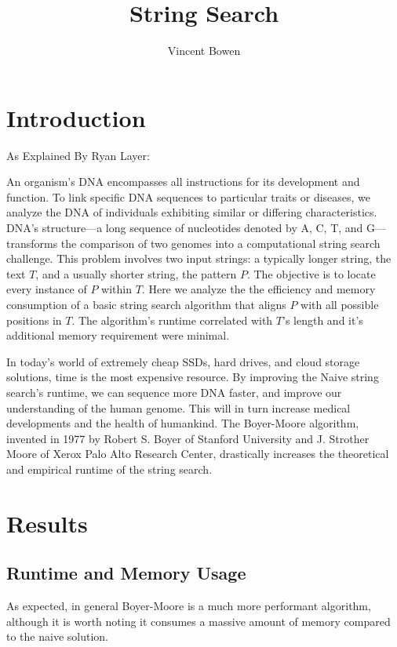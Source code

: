 \documentclass[11pt, letterpaper]{article}
\begin{document}
\title{String Search}
\author{Vincent Bowen}
\maketitle

\section{Introduction}
As Explained By Ryan Layer: 
\begin{displayquote}
    An organism's DNA encompasses all instructions for its development and
function. To link specific DNA sequences to particular traits or diseases, we
analyze the DNA of individuals exhibiting similar or differing characteristics.
DNA's structure—a long sequence of nucleotides denoted by A, C, T, and
G—transforms the comparison of two genomes into a computational string search
challenge. This problem involves two input strings: a typically longer string,
the text $T$, and a usually shorter string, the pattern $P$. The
objective is to locate every instance of $P$ within $T$. Here we analyze the
the efficiency and memory consumption of a basic string search algorithm that
aligns $P$ with all possible positions in $T$.  The algorithm's runtime
correlated with $T$'s length and it's additional memory requirement were
minimal.
\end{displayquote}

In today's world of extremely cheap SSDs, hard drives, and cloud storage solutions, time is the most expensive resource. By improving the Naive string search's runtime, we can sequence more DNA faster, and improve our understanding of the human genome. This will in turn increase medical developments and the health of humankind. The Boyer-Moore algorithm, invented in 1977 by Robert S. Boyer of Stanford University and J. Strother Moore of Xerox Palo Alto Research Center, drastically increases the theoretical and empirical runtime of the string search. 


\section{Results}

\subsection{Runtime and Memory Usage}

As expected, in general Boyer-Moore is a much more performant algorithm, although it is worth noting it consumes a massive amount of memory compared to the naive solution. 
\end{document}
